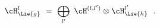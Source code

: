 \begin{equation}\label{numeratorexpansion}
 \cH_\Lie{g}^{l} \ = \ \bigoplus_{l'} \ \cH^{(l,
     l')} \otimes \cH_\Lie{h}^{l'}\ \ . 
\end{equation}

